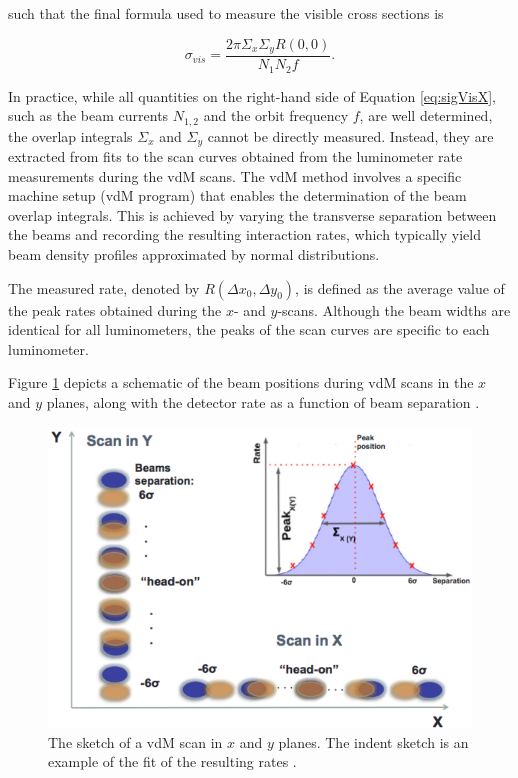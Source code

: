 such that the final formula used to measure the visible cross sections is

\begin{equation}
\label{eq:sigVisX}
 \sigma_{vis}=\frac{2\pi\Sigma_x \Sigma_y R(0,0)}{N_1 N_2 f}.
\end{equation}


In practice, while all quantities on the right-hand side of Equation \ref{eq:sigVisX}, such as the beam currents $N_{1,2}$ and the orbit frequency $f$, are well determined, the overlap integrals $\Sigma_x$ and $\Sigma_y$ cannot be directly measured. Instead, they are extracted from fits to the scan curves obtained from the luminometer rate measurements during the vdM scans. The vdM method involves a specific machine setup (vdM program) that enables the determination of the beam overlap integrals. This is achieved by varying the transverse separation between the beams and recording the resulting interaction rates, which typically yield beam density profiles approximated by normal distributions.

The measured rate, denoted by $R(\Delta x_0, \Delta y_0)$, is defined as the average value of the peak rates obtained during the $x$- and $y$-scans. Although the beam widths are identical for all luminometers, the peaks of the scan curves are specific to each luminometer.

Figure \ref{vdm_sketch} depicts a schematic of the beam positions during vdM scans in the $x$ and $y$ planes, along with the detector rate as a function of beam separation  \cite{pas_18}.

\begin{center}
  \begin{figure}[h]
    \centering
    \includegraphics[scale=.40]{Chapter3/vdm_sketch.png}
    \caption[Sketch of a vdM scan in $x$ and $y$ directions and example of fitting resulting rates]{ The sketch of a vdM scan in $x$ and $y$ planes. The indent sketch is an example of the fit of the resulting rates \cite{vdM_sketch}.}
    \label{vdm_sketch}
  \end{figure}
\end{center}


